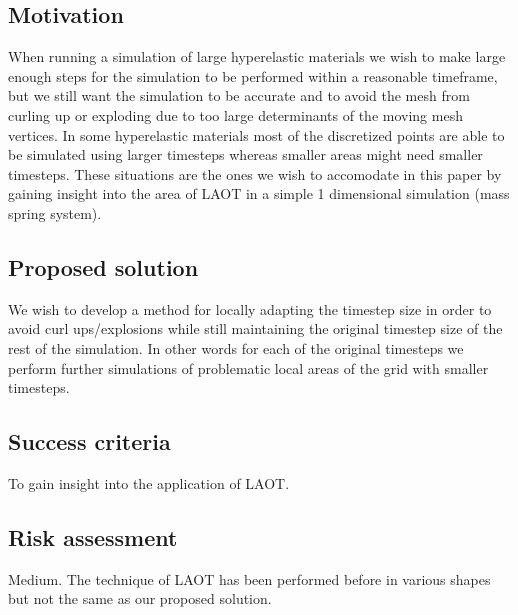 \documentclass[11pt,a4paper]{article}
\begin{document}
\subsection{Motivation}
When running a simulation of large hyperelastic materials we wish to make
large enough steps for the simulation to be performed within a reasonable
timeframe, but we still want the simulation to be accurate and to avoid
the mesh from curling up or exploding due to too large determinants of the
moving mesh vertices. In some hyperelastic materials most of the
discretized points are able to be simulated using larger timesteps whereas
smaller areas might need smaller timesteps. These situations are the ones
we wish to accomodate in this paper by gaining insight into the area of LAOT in
a simple 1 dimensional simulation (mass spring system).

\subsection{Proposed solution}
We wish to develop a method for locally adapting the timestep size in
order to avoid curl ups/explosions while still maintaining the original
timestep size of the rest of the simulation. In other words for each of
the original timesteps we perform further simulations of problematic local
areas of the grid with smaller timesteps.

\subsection{Success criteria}
To gain insight into the application of LAOT.

\subsection{Risk assessment}
Medium. The technique of LAOT has been performed before in various shapes but
not the same as our proposed solution.
\end{document}
